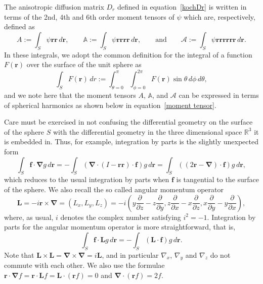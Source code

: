 \documentclass{amsart}
\newcommand\br{{\mathbf r}}
\newcommand\bL{{\mathbf L}}
\newcommand\boldf{{\mathbf f}}
\newcommand\bnabla{{\boldsymbol \nabla}}
\begin{document}
The anisotropic diffusion matrix $D_r$ defined in equation~\eqref{kochDr} is written in terms of the 2nd, 4th and 6th order moment tensors of $\psi$
which are, respectively, defined as
\begin{equation}
\label{momenttensors}
 A := \int_S \psi \br\br \, d\br ,\qquad
\mathbb A := \int_S \psi \br\br\br\br \, d\br ,\qquad \text{and}
\qquad \mathcal A := \int_S \psi \br\br\br\br\br\br \, d\br .
\end{equation}
In these integrals, we adopt the common definition for the integral of a function $F(\br)$ over the surface of the unit sphere as
\begin{equation}
\int_S F(\br) \, dr := \int_{\theta=0}^\pi \int_{\phi=0}^{2\pi}
F(\br) \sin\theta\,d\phi\,d\theta ,
\end{equation}
and we note here that the moment tensors $A$, $\mathbb A$, and $\mathcal{A}$ can be expressed in terms of spherical harmonics as shown below in
equation~\eqref{moment tensor}.

Care must be exercised in not confusing the differential geometry on the surface of the sphere $S$ with the differential geometry
in the three dimensional space $\mathbb R^3$ it is embedded in.  Thus, for example, integration by parts
is the slightly unexpected form
\begin{equation}
\label{by-parts}
\int_S \boldf \cdot \bnabla g\, d\br  = - \int_S (\bnabla\cdot (I-\br\br)\cdot\boldf) g\, d\br = \int_S ((2\br - \bnabla)\cdot\boldf)g \, d\br ,
\end{equation}
which reduces to the usual integration by parts when $\boldf$ is
tangential to the surface of the sphere. We also recall the so
called angular momentum operator
\begin{equation}
\label{ang-momentum-ops}
\bL = -i\br\times\bnabla = (L_x,L_y,L_z) =
-i\left(y\frac\partial{\partial z} - z\frac\partial{\partial y} ,
z\frac\partial{\partial x} - x\frac\partial{\partial z} ,
x\frac\partial{\partial y} - y\frac\partial{\partial x} \right) ,
\end{equation}
where, as usual,  $i$ denotes the complex number satisfying $i^2=-1$.  Integration by parts for the angular momentum operator is more straightforward, that is,
\begin{equation}
\label{by-parts-l}
\int_S \boldf \cdot \bL g\, d\br  = -\int_S (\bL\cdot\boldf) g\, d\br .
\end{equation}
Note that $\bL\times\bL = \bnabla\times\bnabla = i\bL$, and in particular $\nabla_x$, $\nabla_y$ and $\nabla_z$
do not commute with each other. We also use the formulae $\br\cdot\bnabla f=\br\cdot\bL f=\bL\cdot(\br f) = 0$ and $\bnabla\cdot(\br f) = 2f$.
\end{document}

